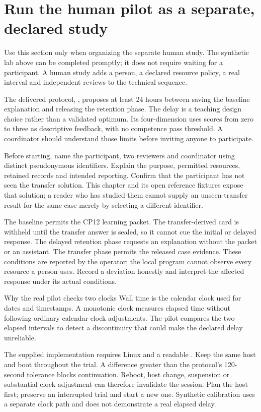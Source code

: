 \section{Run the human pilot as a separate, declared study}\label{sec:ch13-pilot}

Use this section only when organizing the separate human study. The synthetic lab above can be completed promptly; it does not require waiting for a participant. A human study adds a person, a declared resource policy, a real interval and independent reviews to the technical sequence.

The delivered protocol, , proposes at least 24 hours between saving the baseline explanation and releasing the retention phase. The delay is a teaching design choice rather than a validated optimum. Its four-dimension  uses scores from zero to three as descriptive feedback, with no competence pass threshold. A coordinator should understand those limits before inviting anyone to participate.

Before starting, name the participant, two reviewers and coordinator using distinct pseudonymous identifiers. Explain the purpose, permitted resources, retained records and intended reporting. Confirm that the participant has not seen the transfer solution. This chapter and its open reference fixtures expose that solution; a reader who has studied them cannot supply an unseen-transfer result for the same case merely by selecting a different identifier.

The baseline permits the CP12 learning packet. The transfer-derived  card is withheld until the transfer answer is sealed, so it cannot cue the initial or delayed response. The delayed retention phase requests an explanation without the packet or an assistant. The transfer phase permits the released case evidence. These conditions are reported by the operator; the local program cannot observe every resource a person uses. Record a deviation honestly and interpret the affected response under its actual conditions.

\begin{readerbox}{Why the real pilot checks two clocks}
Wall time is the calendar clock used for dates and timestamps. A monotonic clock measures elapsed time without following ordinary calendar-clock adjustments. The pilot compares the two elapsed intervals to detect a discontinuity that could make the declared delay unreliable.

The supplied implementation requires Linux and a readable . Keep the same host and boot throughout the trial. A difference greater than the protocol's 120-second tolerance blocks continuation. Reboot, host change, suspension or substantial clock adjustment can therefore invalidate the session. Plan the host first; preserve an interrupted trial and start a new one. Synthetic calibration uses a separate clock path and does not demonstrate a real elapsed delay.
\end{readerbox}

